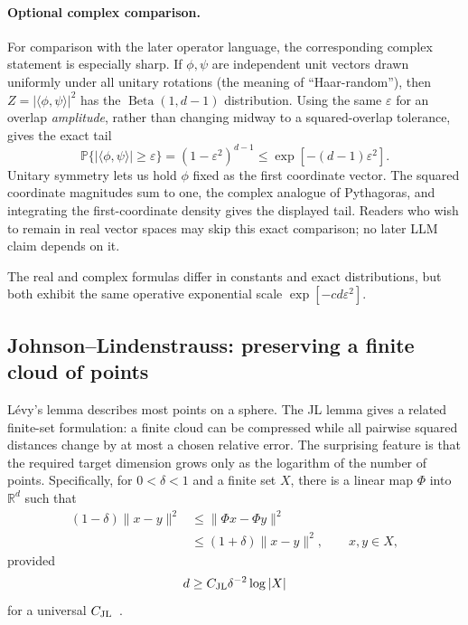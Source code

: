 \documentclass[
  aps,
  reprint,
  superscriptaddress,
  floatfix,
  nofootinbib,
  longbibliography
]{revtex4-2}
\newcommand{\R}{\mathbb{R}}
\newcommand{\Prob}{\mathbb{P}}
\newcommand{\norm}[1]{\lVert #1 \rVert}
\begin{document}
\paragraph{Optional complex comparison.}
For comparison with the later operator language, the corresponding complex
statement is especially sharp.  If $\phi,\psi$ are independent unit vectors
drawn uniformly under all unitary rotations (the meaning of ``Haar-random''), then
$Z=|\langle\phi,\psi\rangle|^2$ has the
$\operatorname{Beta}(1,d-1)$ distribution.  Using the same
$\varepsilon$ for an overlap \emph{amplitude}, rather than changing midway to
a squared-overlap tolerance, gives the exact tail
\begin{equation}
\label{eq:complex-haar-tail}
\Prob\{|\langle\phi,\psi\rangle|\geq\varepsilon\}
=(1-\varepsilon^2)^{d-1}
\leq
\exp[-(d-1)\varepsilon^2].
\end{equation}
Unitary symmetry lets us hold $\phi$ fixed as the first coordinate vector.
The squared coordinate magnitudes sum to one, the complex analogue of
Pythagoras, and integrating the first-coordinate density gives the displayed
tail.  Readers who wish to remain in real vector spaces may skip this exact
comparison; no later LLM claim depends on it.

The real and complex formulas differ in constants and exact distributions,
but both exhibit the same operative exponential scale
$\exp[-c d\varepsilon^2]$.

\subsection{Johnson--Lindenstrauss: preserving a finite cloud of points}
\label{sec:jl}

L\'evy's lemma describes most points on a sphere.  The JL lemma gives a related
finite-set formulation: a finite cloud can be compressed while all pairwise
squared distances change by at most a chosen relative error.  The surprising
feature is that the required target dimension grows only as the logarithm of
the number of points.  Specifically, for
$0<\delta<1$ and a finite set $X$, there is a linear map
$\Phi$ into $\R^d$ such that
\begin{equation}
\label{eq:jl}
\begin{aligned}
(1-\delta)\norm{x-y}^2
&\leq\norm{\Phi x-\Phi y}^2\\
&\leq(1+\delta)\norm{x-y}^2,
\qquad x,y\in X,
\end{aligned}
\end{equation}
provided
\begin{equation}
\label{eq:jl-dimension}
d\geq C_{\rm JL}\delta^{-2}\log |X|
\end{equation}
for a universal $C_{\rm JL}$~\cite{johnson-1984,Dasgupta-2003}.
\end{document}
